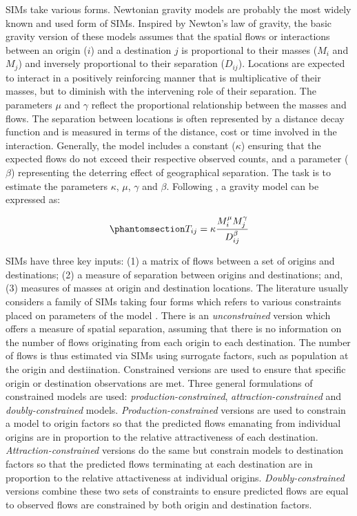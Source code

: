 \documentclass[
  a4paper, 
  twoside,
  final
]{article}
\begin{document}
SIMs take various forms. Newtonian gravity models are probably the most
widely known and used form of SIMs. Inspired by Newton's law of gravity,
the basic gravity version of these models assumes that the spatial flows
or interactions between an origin (\(i\)) and a destination \(j\) is
proportional to their masses (\(M_{i}\) and \(M_{j}\)) and inversely
proportional to their separation (\(D_{ij}\)). Locations are expected to
interact in a positively reinforcing manner that is multiplicative of
their masses, but to diminish with the intervening role of their
separation. The parameters \(\mu\) and \(\gamma\) reflect the
proportional relationship between the masses and flows. The separation
between locations is often represented by a distance decay function and
is measured in terms of the distance, cost or time involved in the
interaction. Generally, the model includes a constant (\(\kappa\))
ensuring that the expected flows do not exceed their respective observed
counts, and a parameter (\(\beta\)) representing the deterring effect of
geographical separation. The task is to estimate the parameters
\(\kappa\), \(\mu\), \(\gamma\) and \(\beta\). Following
\citet{wilson1971}, a gravity model can be expressed as:

\begin{equation}\phantomsection\label{eq-1}{
T_{ij} = \kappa \frac{M^{\mu}_{i} M^{\gamma}_{j}}{D^{\beta}_{ij} }
}\end{equation}

SIMs have three key inputs: (1) a matrix of flows between a set of
origins and destinations; (2) a measure of separation between origins
and destinations; and, (3) measures of masses at origin and destination
locations. The literature usually considers a family of SIMs taking four
forms which refers to various constraints placed on parameters of the
model \citep{wilson1971}. There is an \emph{unconstrained} version which
offers a measure of spatial separation, assuming that there is no
information on the number of flows originating from each origin to each
destination. The number of flows is thus estimated via SIMs using
surrogate factors, such as population at the origin and destiination.
Constrained versions are used to ensure that specific origin or
destination observations are met. Three general formulations of
constrained models are used: \emph{production-constrained},
\emph{attraction-constrained} and \emph{doubly-constrained} models.
\emph{Production-constrained} versions are used to constrain a model to
origin factors so that the predicted flows emanating from individual
origins are in proportion to the relative attractiveness of each
destination. \emph{Attraction-constrained} versions do the same but
constrain models to destination factors so that the predicted flows
terminating at each destination are in proportion to the relative
attactiveness at individual origins. \emph{Doubly-constrained} versions
combine these two sets of constraints to ensure predicted flows are
equal to observed flows are constrained by both origin and destination
factors.
\end{document}
